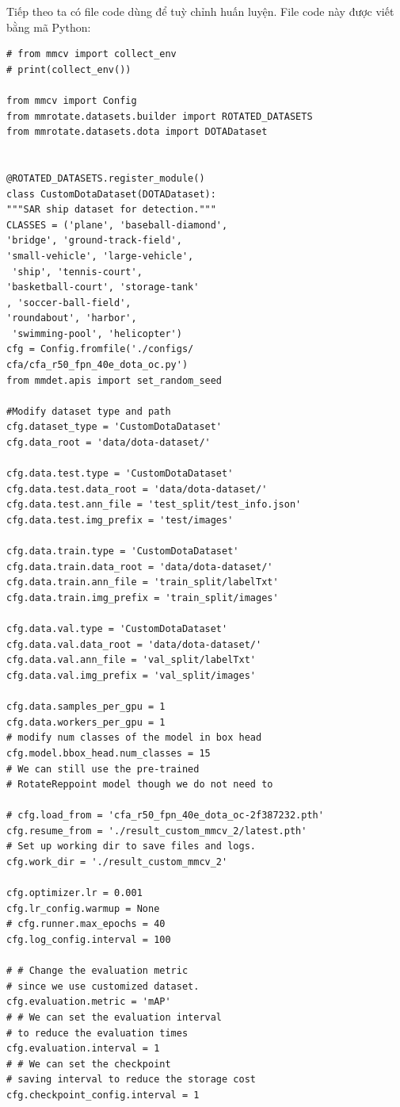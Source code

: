 \documentclass[12pt,a4paper,openany,oneside]{report}
\begin{document}
Tiếp theo ta có file code dùng để tuỳ chỉnh huấn luyện. File code này được viết bằng mã Python:
\begin{lstlisting}
# from mmcv import collect_env
# print(collect_env())

from mmcv import Config
from mmrotate.datasets.builder import ROTATED_DATASETS
from mmrotate.datasets.dota import DOTADataset


@ROTATED_DATASETS.register_module()
class CustomDotaDataset(DOTADataset):
"""SAR ship dataset for detection."""
CLASSES = ('plane', 'baseball-diamond', 
'bridge', 'ground-track-field',
'small-vehicle', 'large-vehicle',
 'ship', 'tennis-court',
'basketball-court', 'storage-tank'
, 'soccer-ball-field',
'roundabout', 'harbor',
 'swimming-pool', 'helicopter')
cfg = Config.fromfile('./configs/
cfa/cfa_r50_fpn_40e_dota_oc.py')
from mmdet.apis import set_random_seed

#Modify dataset type and path
cfg.dataset_type = 'CustomDotaDataset'
cfg.data_root = 'data/dota-dataset/'

cfg.data.test.type = 'CustomDotaDataset'
cfg.data.test.data_root = 'data/dota-dataset/'
cfg.data.test.ann_file = 'test_split/test_info.json'
cfg.data.test.img_prefix = 'test/images'

cfg.data.train.type = 'CustomDotaDataset'
cfg.data.train.data_root = 'data/dota-dataset/'
cfg.data.train.ann_file = 'train_split/labelTxt'
cfg.data.train.img_prefix = 'train_split/images'

cfg.data.val.type = 'CustomDotaDataset'
cfg.data.val.data_root = 'data/dota-dataset/'
cfg.data.val.ann_file = 'val_split/labelTxt'
cfg.data.val.img_prefix = 'val_split/images'

cfg.data.samples_per_gpu = 1
cfg.data.workers_per_gpu = 1
# modify num classes of the model in box head
cfg.model.bbox_head.num_classes = 15
# We can still use the pre-trained
# RotateReppoint model though we do not need to

# cfg.load_from = 'cfa_r50_fpn_40e_dota_oc-2f387232.pth'
cfg.resume_from = './result_custom_mmcv_2/latest.pth'
# Set up working dir to save files and logs.
cfg.work_dir = './result_custom_mmcv_2'

cfg.optimizer.lr = 0.001
cfg.lr_config.warmup = None
# cfg.runner.max_epochs = 40
cfg.log_config.interval = 100

# # Change the evaluation metric 
# since we use customized dataset.
cfg.evaluation.metric = 'mAP'
# # We can set the evaluation interval 
# to reduce the evaluation times
cfg.evaluation.interval = 1
# # We can set the checkpoint
# saving interval to reduce the storage cost
cfg.checkpoint_config.interval = 1


\end{lstlisting}
\end{document}
